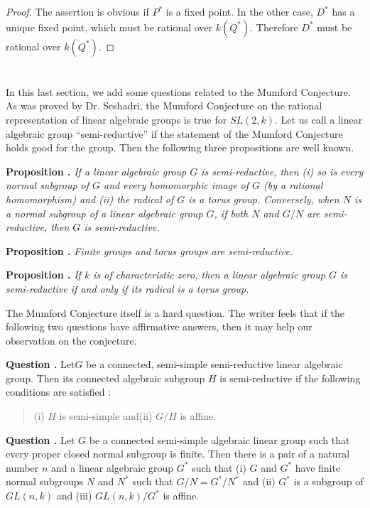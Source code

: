 \begin{proof}
The assertion is obvious if $P^{*}$ is a fixed point. In the other case, $D^{*}$ has a unique fixed point, which must be rational over $k(Q^{*})$. Therefore $D^{*}$ must be rational over $k(Q^{*})$.
\end{proof}

\section{}\label{art16-sec5}
In this last section, we add some questions related to the Mumford Conjecture. As was proved by Dr. Seshadri, the Mumford Conjecture on the rational representation of linear algebraic groups is true for $SL(2,k)$. Let us call a linear algebraic group ``semi-reductive'' if the statement of the Mumford Conjecture holds good for the group. Then the following three propositions are well known.

\medskip
\noindent
{\bf Proposition .\label{art16-prop5.1}}
{\em If a linear algebraic group $G$ is semi-reductive, then {\rm(i)} so is every normal subgroup of $G$ and every homomorphic image of $G$ (by a rational homomorphism) and {\rm(ii)} the radical of $G$ is a torus group. Conversely, when $N$ is a normal subgroup of a linear algebraic group $G$, if both $N$ and $G/N$ are semi-reductive, then $G$ is semi-reductive.}

\medskip
\noindent
{\bf Proposition .\label{art16-prop5.2}}
{\em Finite groups and torus groups are semi-reductive.}

\medskip
\noindent
{\bf Proposition .\label{art16-prop5.3}}
{\em If $k$ is of characteristic zero, then a linear algebraic group $G$ is semi-reductive if and only if its radical is a torus group.}
\smallskip

The Mumford Conjecture itself is a hard question. The writer feels that if the following two questions have affirmative answers, then it may help our observation on the conjecture.

\medskip
\noindent
{\bf Question .\label{art16-ques5.4}}
Let\pageoriginale $G$ be a connected, semi-simple semi-reductive linear algebraic group. Then its connected algebraic subgroup $H$ is semi-reductive if the following conditions are satisfied :
\begin{quote}
(i) $H$ is semi-simple and\quad (ii) $G/H$ is affine.
\end{quote}

\medskip
\noindent
{\bf Question .\label{art16-ques5.5}}
Let $G$ be a connected semi-simple algebraic linear group such that every proper closed normal subgroup is finite. Then there is a pair of a natural number $n$ and a linear algebraic group $G^{*}$ such that (i) $G$ and $G^{*}$ have finite normal subgroups $N$ and $N^{*}$ such that $G/N=G^{*}/N^{*}$ and (ii) $G^{*}$ is a subgroup of $GL(n,k)$ and (iii) $GL(n,k)/G^{*}$ is affine.
\smallskip

